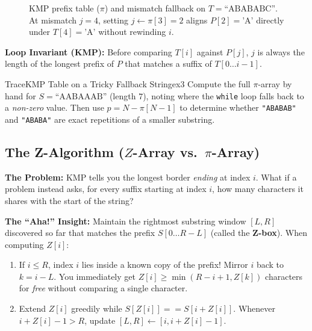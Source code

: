 \documentclass[11pt,a4paper]{article}
\theoremstyle{definition}
\newcommand{\painbeat}{\textbf{\color{accentamber}The Problem:} }
\newcommand{\ahabeat}{\textbf{\color{accentteal}The ``Aha!'' Insight:} }
\newcommand{\invariantbeat}[1]{\par\noindent\textbf{\color{accentteal}Loop Invariant (#1):} }
\begin{document}
\begin{figure}[htbp]
\caption{KMP prefix table ($\pi$) and mismatch fallback on $T = \text{``ABABABC''}$. At mismatch $j = 4$, setting $j \leftarrow \pi[3] = 2$ aligns $P[2] = \text{'A'}$ directly under $T[4] = \text{'A'}$ without rewinding $i$.}
\label{fig:kmp_fallback}
\end{figure}

\invariantbeat{KMP} Before comparing $T[i]$ against $P[j]$, $j$ is always the length of the longest prefix of $P$ that matches a suffix of $T[0 \dots i - 1]$.

\begin{tryitbox}{Trace}{KMP Table on a Tricky Fallback String}{ex3}
Compute the full $\pi$-array by hand for $S = \text{``AABAAAB''}$ (length $7$), noting where the \texttt{while} loop falls back to a \emph{non-zero} value. Then use $p = N - \pi[N - 1]$ to determine whether \texttt{"ABABAB"} and \texttt{"ABABA"} are exact repetitions of a smaller substring.
\end{tryitbox}

\subsection{The Z-Algorithm ($Z$-Array vs.\ $\pi$-Array)}

\painbeat KMP tells you the longest border \emph{ending} at index $i$. What if a problem instead asks, for every suffix starting at index $i$, how many characters it shares with the start of the string?

\ahabeat Maintain the rightmost substring window $[L, R]$ discovered so far that matches the prefix $S[0 \dots R - L]$ (called the \textbf{Z-box}). When computing $Z[i]$:
\begin{enumerate}
    \item If $i \le R$, index $i$ lies inside a known copy of the prefix! Mirror $i$ back to $k = i - L$. You immediately get $Z[i] \ge \min(R - i + 1, Z[k])$ characters for \emph{free} without comparing a single character.
    \item Extend $Z[i]$ greedily while $S[Z[i]] == S[i + Z[i]]$. Whenever $i + Z[i] - 1 > R$, update $[L, R] \leftarrow [i, i + Z[i] - 1]$.
\end{enumerate}
\end{document}
